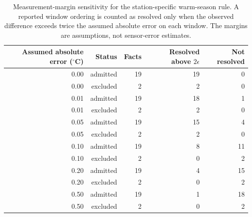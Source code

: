 \begin{table}[t]
\centering\small
\caption{Measurement-margin sensitivity for the station-specific warm-season rule. A reported window ordering is counted as resolved only when the observed difference exceeds twice the assumed absolute error on each window. The margins are assumptions, not sensor-error estimates.}
\label{tab:rule-measurement-margins}
\begin{tabular}{rrrrr}
\toprule
Assumed absolute error ($^{\circ}$C) & Status & Facts & Resolved above $2\epsilon$ & Not resolved \\
\midrule
0.00 & admitted & 19 & 19 & 0 \\
0.00 & excluded & 2 & 2 & 0 \\
0.01 & admitted & 19 & 18 & 1 \\
0.01 & excluded & 2 & 2 & 0 \\
0.05 & admitted & 19 & 15 & 4 \\
0.05 & excluded & 2 & 2 & 0 \\
0.10 & admitted & 19 & 8 & 11 \\
0.10 & excluded & 2 & 0 & 2 \\
0.20 & admitted & 19 & 4 & 15 \\
0.20 & excluded & 2 & 0 & 2 \\
0.50 & admitted & 19 & 1 & 18 \\
0.50 & excluded & 2 & 0 & 2 \\
\bottomrule
\end{tabular}
\end{table}
